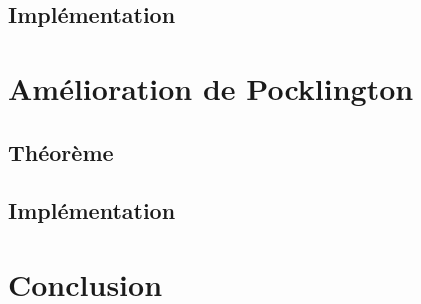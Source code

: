 \documentclass[a4paper]{article}
\begin{document}
\subsection{Implémentation}

\section{Amélioration de Pocklington}

\subsection{Théorème}

\subsection{Implémentation}

\section*{Conclusion}
\end{document}
